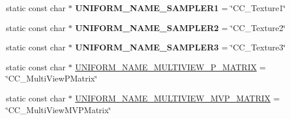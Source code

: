 \begin{Indent}
\begin{DoxyCompactItemize}
\item 
\mbox{\label{classGLProgram_a8b4cc38b056416d198e3fec352820b35}} 
static const char $\ast$ {\bfseries U\+N\+I\+F\+O\+R\+M\+\_\+\+N\+A\+M\+E\+\_\+\+S\+A\+M\+P\+L\+E\+R1} = \char`\"{}C\+C\+\_\+\+Texture1\char`\"{}
\item 
\mbox{\label{classGLProgram_ad1165bb85c24b5573714636a281cc3c5}} 
static const char $\ast$ {\bfseries U\+N\+I\+F\+O\+R\+M\+\_\+\+N\+A\+M\+E\+\_\+\+S\+A\+M\+P\+L\+E\+R2} = \char`\"{}C\+C\+\_\+\+Texture2\char`\"{}
\item 
\mbox{\label{classGLProgram_af484cc385827608b6fba1f3bcbbb3636}} 
static const char $\ast$ {\bfseries U\+N\+I\+F\+O\+R\+M\+\_\+\+N\+A\+M\+E\+\_\+\+S\+A\+M\+P\+L\+E\+R3} = \char`\"{}C\+C\+\_\+\+Texture3\char`\"{}
\item 
static const char $\ast$ \hyperlink{classGLProgram_a6771fbd4f50fafc21be0f553f1462301}{U\+N\+I\+F\+O\+R\+M\+\_\+\+N\+A\+M\+E\+\_\+\+M\+U\+L\+T\+I\+V\+I\+E\+W\+\_\+\+P\+\_\+\+M\+A\+T\+R\+IX} = \char`\"{}C\+C\+\_\+\+Multi\+View\+P\+Matrix\char`\"{}
\item 
static const char $\ast$ \hyperlink{classGLProgram_a697df6ac8b4d3492bf95eef849f61177}{U\+N\+I\+F\+O\+R\+M\+\_\+\+N\+A\+M\+E\+\_\+\+M\+U\+L\+T\+I\+V\+I\+E\+W\+\_\+\+M\+V\+P\+\_\+\+M\+A\+T\+R\+IX} = \char`\"{}C\+C\+\_\+\+Multi\+View\+M\+V\+P\+Matrix\char`\"{}
\end{DoxyCompactItemize}
\end{Indent}
